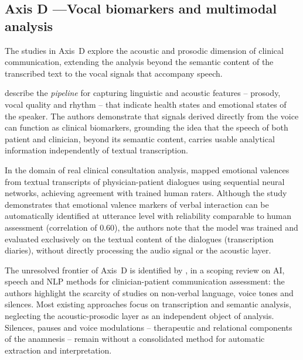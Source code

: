 \documentclass[review,12pt]{elsarticle}
\begin{document}
\subsection{Axis D —Vocal biomarkers and multimodal analysis}
\label{subsec:eixoD}

The studies in Axis~D explore the acoustic and prosodic dimension of clinical
communication, extending the analysis beyond the semantic content of the
transcribed text to the vocal signals that accompany speech.

\citet{Fagherazzi2021} describe the \textit{pipeline} for capturing linguistic
and acoustic features -- prosody, vocal quality and rhythm -- that indicate
health states and emotional states of the speaker. The authors demonstrate
that signals derived directly from the voice can function as clinical
biomarkers, grounding the idea that the speech of both patient and clinician,
beyond its semantic content, carries usable analytical information
independently of textual transcription.

In the domain of real clinical consultation analysis, \citet{Imel2022} mapped
emotional valences from textual transcripts of physician-patient dialogues
using sequential neural networks, achieving agreement with trained human
raters. Although the study demonstrates that emotional valence markers of
verbal interaction can be automatically identified at utterance level with
reliability comparable to human assessment (correlation of 0.60), the authors
note that the model was trained and evaluated exclusively on the textual
content of the dialogues (transcription diaries), without directly processing
the audio signal or the acoustic layer.

The unresolved frontier of Axis~D is identified by \citet{Albert2024}, in a
scoping review on AI, speech and NLP methods for clinician-patient
communication assessment: the authors highlight the scarcity of studies on
non-verbal language, voice tones and silences. Most existing approaches focus
on transcription and semantic analysis, neglecting the acoustic-prosodic layer
as an independent object of analysis. Silences, pauses and voice modulations --
therapeutic and relational components of the anamnesis -- remain without a
consolidated method for automatic extraction and interpretation.
\end{document}
